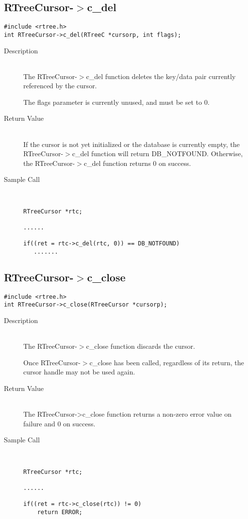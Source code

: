 \documentclass[12pt]{article}
\def\cdf{\sf }
\def\cdf{\sf }
\newcommand{\RTreeCursor}{{\small{\cdf RTreeCursor}}}
\newcommand{\DBNOTFOUND}{{\small{\cdf DB\_NOTFOUND}}}
\begin{document}
\newpage
\subsection{{\RTreeCursor}-$>$c\_del}
\begin{verbatim}
#include <rtree.h>
int RTreeCursor->c_del(RTreeC *cursorp, int flags);
\end{verbatim}
\begin{description}
\item[Description]\ \\

  The RTreeCursor-$>$c\_del function deletes the key/data pair currently
  referenced by the cursor. 

  The flags parameter is currently unused, and must be set to 0. 

\item[Return Value]\ \\
  If the cursor is not yet initialized or the database is
  currently empty, the RTreeCursor-$>$c\_del
  function will return {\DBNOTFOUND}. Otherwise, the
  RTreeCursor-$>$c\_del function returns 0 on success. 

\item[Sample Call]\ 
\begin{verbatim}
RTreeCursor *rtc;

......

if((ret = rtc->c_del(rtc, 0)) == DB_NOTFOUND)
   .......
\end{verbatim}
\end{description}

\newpage
\subsection{{\RTreeCursor}-$>$c\_close}
\begin{verbatim}
#include <rtree.h>
int RTreeCursor->c_close(RTreeCursor *cursorp);
\end{verbatim}
\begin{description}
\item[Description]\ \\

  The RTreeCursor-$>$c\_close function discards the cursor. 

  Once RTreeCursor-$>$c\_close has been called, regardless of its
  return, the cursor handle may not be used again. 

\item[Return Value]\ \\
  The RTreeCursor->c\_close function returns a non-zero error value
  on failure and 0 on success.

\item[Sample Call]\ 
\begin{verbatim}
RTreeCursor *rtc;

......

if((ret = rtc->c_close(rtc)) != 0)
    return ERROR;
\end{verbatim}
\end{description}

\newpage
\tableofcontents
\end{document}

